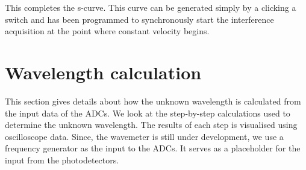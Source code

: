 \documentclass[12pt, twoside]{report}
\begin{document}
\vspace{0.5em}
This completes the s-curve. This curve can be generated simply by a clicking a switch and has been programmed to synchronously start the interference acquisition at the point where constant velocity begins.

\section{Wavelength calculation}\label{interfero}

This section gives details about how the unknown wavelength is calculated from the input data of the ADCs. We look at the step-by-step calculations used to determine the unknown wavelength. The results of each step is visualised using oscilloscope data. Since, the wavemeter is still under development, we use a frequency generator as the input to the ADCs. It serves as a placeholder for the input from the photodetectors.
\end{document}
